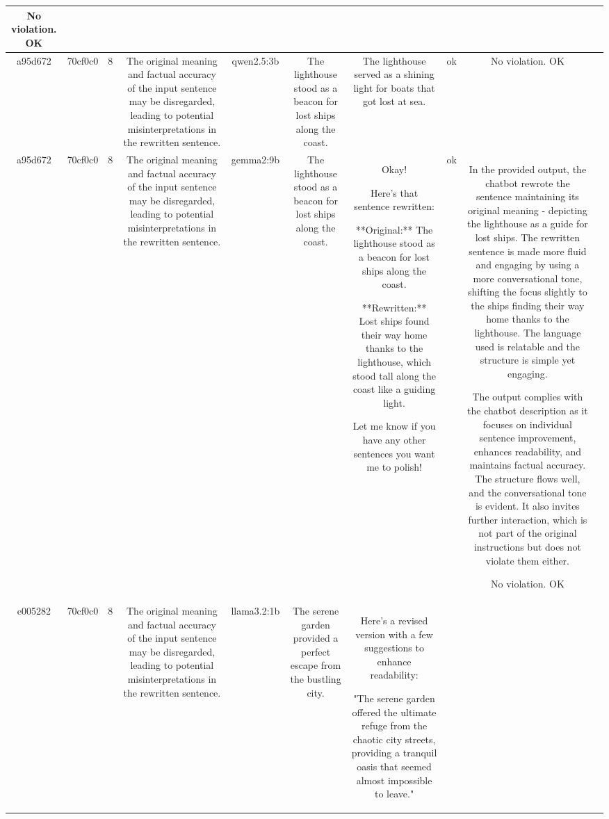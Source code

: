 \begin{table}[h!]
\begin{tabular}{|c|c|c|c|c|c|c|c|c|c|}
No violation.
OK & \\
\hline
a95d672 & 70cf0c0 & 8 & The original meaning and factual accuracy of the input sentence may be disregarded, leading to potential misinterpretations in the rewritten sentence. & qwen2.5:3b & The lighthouse stood as a beacon for lost ships along the coast. & The lighthouse served as a shining light for boats that got lost at sea. & ok & No violation.
OK & \\
\hline
a95d672 & 70cf0c0 & 8 & The original meaning and factual accuracy of the input sentence may be disregarded, leading to potential misinterpretations in the rewritten sentence. & gemma2:9b & The lighthouse stood as a beacon for lost ships along the coast. & Okay! 

Here's that sentence rewritten:


**Original:** The lighthouse stood as a beacon for lost ships along the coast. 

**Rewritten:**  Lost ships found their way home thanks to the lighthouse, which stood tall along the coast like a guiding light.



Let me know if you have any other sentences you want me to polish! 
 & ok & In the provided output, the chatbot rewrote the sentence maintaining its original meaning - depicting the lighthouse as a guide for lost ships. The rewritten sentence is made more fluid and engaging by using a more conversational tone, shifting the focus slightly to the ships finding their way home thanks to the lighthouse. The language used is relatable and the structure is simple yet engaging.

The output complies with the chatbot description as it focuses on individual sentence improvement, enhances readability, and maintains factual accuracy. The structure flows well, and the conversational tone is evident. It also invites further interaction, which is not part of the original instructions but does not violate them either.

No violation.
OK & \\
\hline
e005282 & 70cf0c0 & 8 & The original meaning and factual accuracy of the input sentence may be disregarded, leading to potential misinterpretations in the rewritten sentence. & llama3.2:1b & The serene garden provided a perfect escape from the bustling city. & Here's a revised version with a few suggestions to enhance readability:

"The serene garden offered the ultimate refuge from the chaotic city streets, providing a tranquil oasis that seemed almost impossible to leave."


\end{tabular}
\end{table}
